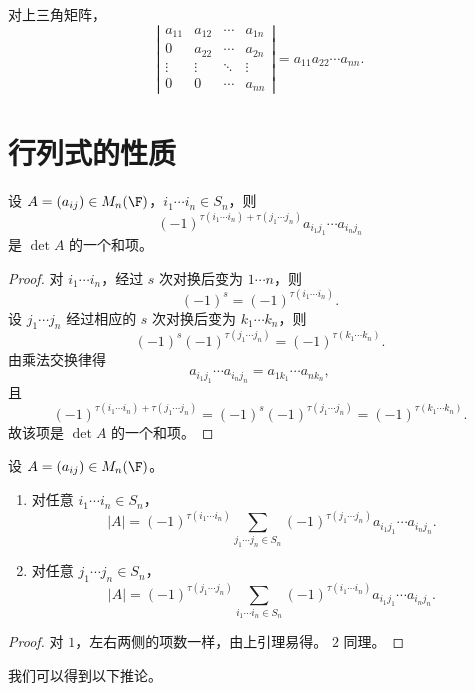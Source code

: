 对上三角矩阵，
\[
\left|
\begin{matrix}
	a_{11}&a_{12}&\cdots&a_{1n}\\
	0&a_{22}&\cdots&a_{2n}\\
	\vdots&\vdots&\ddots&\vdots\\
	0&0&\cdots&a_{nn}
\end{matrix}
\right|
=a_{11}a_{22}\cdots a_{nn}.
\]

\section{行列式的性质}

\begin{lemma}\label{3.7.1}
	设 $A=(a_{ij})\in M_n(\F)$，$i_1\cdots i_n\in S_n$，则
	\[
	(-1)^{\tau(i_1\cdots i_n)+\tau(j_1\cdots j_n)}
	a_{i_1j_1}\cdots a_{i_nj_n}
	\]
	是 $\det A$ 的一个和项。
\end{lemma}

\begin{proof}
	对 $i_1\cdots i_n$，经过 $s$ 次对换后变为 $1\cdots n$，则
	\[
	(-1)^s=(-1)^{\tau(i_1\cdots i_n)}.
	\]
	设 $j_1\cdots j_n$ 经过相应的 $s$ 次对换后变为 $k_1\cdots k_n$，则
	\[
	(-1)^s(-1)^{\tau(j_1\cdots j_n)}=(-1)^{\tau(k_1\cdots k_n)}.
	\]
	由乘法交换律得
	\[
	a_{i_1j_1}\cdots a_{i_nj_n}=a_{1k_1}\cdots a_{nk_n},
	\]
	且
	\[
	(-1)^{\tau(i_1\cdots i_n)+\tau(j_1\cdots j_n)}
	=(-1)^s(-1)^{\tau(j_1\cdots j_n)}
	=(-1)^{\tau(k_1\cdots k_n)}.
	\]
	故该项是 $\det A$ 的一个和项。
\end{proof}

\begin{proposition}\label{3.7.2}
	设 $A=(a_{ij})\in M_n(\F)$。
	\begin{enumerate}
		\item 对任意 $i_1\cdots i_n\in S_n$，
		\[
		|A|=(-1)^{\tau(i_1\cdots i_n)}
		\sum_{j_1\cdots j_n\in S_n}
		(-1)^{\tau(j_1\cdots j_n)}
		a_{i_1j_1}\cdots a_{i_nj_n}.
		\]
		\item 对任意 $j_1\cdots j_n\in S_n$，
		\[
		|A|=(-1)^{\tau(j_1\cdots j_n)}
		\sum_{i_1\cdots i_n\in S_n}
		(-1)^{\tau(i_1\cdots i_n)}
		a_{i_1j_1}\cdots a_{i_nj_n}.
		\]
	\end{enumerate}
\end{proposition}

\begin{proof}
	对 $1$，左右两侧的项数一样，由上引理易得。
	$2$ 同理。
\end{proof}

我们可以得到以下推论。

